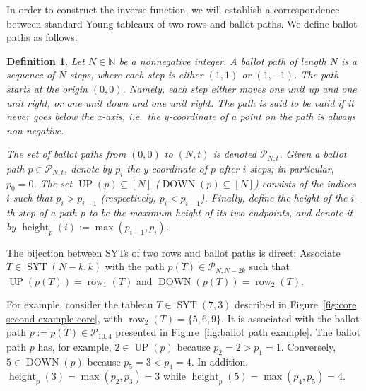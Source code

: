 \documentclass[11pt]{article}
\newtheorem{definition}[theo]{Definition}
\theoremstyle{definition}
\providecommand{\ie}{i.e.\ }
\numberwithin{equation}{section}
\newcommand{\Syt}{\operatorname{SYT}}
\newcommand{\height}{\operatorname{height}}
\newcommand{\row}{\operatorname{row}}
\newcommand{\UP}{\operatorname{UP}}
\newcommand{\DOWN}{\operatorname{DOWN}}
\newcommand{\NN}{\mathbb{N}}
\newcommand{\Pcal}{\mathcal{P}}
\begin{document}
In order to construct the inverse function, we will establish a correspondence between standard Young tableaux of two rows and ballot paths. We define ballot paths as follows:
\begin{definition}
\label{def:ballot path}
    Let $N \in \NN$ be a nonnegative integer. A \emph{ballot path} of length $N$ is a sequence of $N$ steps, where each step is either $(1,1)$ or $(1,-1)$. The path starts at the origin $(0,0)$. Namely, each step either moves one unit up and one unit right, or one unit down and one unit right. The path is said to be valid if it never goes below the x-axis, \ie the y-coordinate of a point on the path is always non-negative.

    The set of ballot paths from $(0,0)$ to $(N,t)$ is denoted $\Pcal_{N,t}$. Given a ballot path $p \in \Pcal_{N,t}$, denote by $p_i$ the y-coordinate of $p$ after $i$ steps; in particular, $p_0=0$. The set $\UP(p) \subseteq [N]$ ($\DOWN(p) \subseteq [N]$) consists of the indices $i$ such that $p_i > p_{i-1}$ (respectively, $p_i < p_{i-1}$). Finally, define the height of the $i$-th \emph{step} of a path $p$ to be the maximum height of its two endpoints, and denote it by $\height_p(i) := \max(p_{i-1},p_i)$.
\end{definition}

The bijection between SYTs of two rows and ballot paths is direct: Associate $T \in \Syt(N-k,k)$ with the path $p(T) \in \Pcal_{N,N-2k}$ such that $\UP(p(T)) = \row_1(T)$ and $\DOWN(p(T)) = \row_2(T)$.

For example, consider the tableau $T \in \Syt(7,3)$ described in Figure~\ref{fig:core second example core}, with $\row_2(T) = \{5,6,9\}$. It is associated with the ballot path $p := p(T) \in \Pcal_{10,4}$ presented in Figure~\ref{fig:ballot path example}. The ballot path $p$ has, for example, $2 \in \UP(p)$ because $p_2 = 2 > p_1 = 1$. Conversely, $5 \in \DOWN(p)$ because $p_5 = 3 < p_4 = 4$. In addition, $\height_p(3) = \max(p_2,p_3) = 3$ while $\height_p(5) = \max(p_4,p_5) = 4$.
\end{document}
